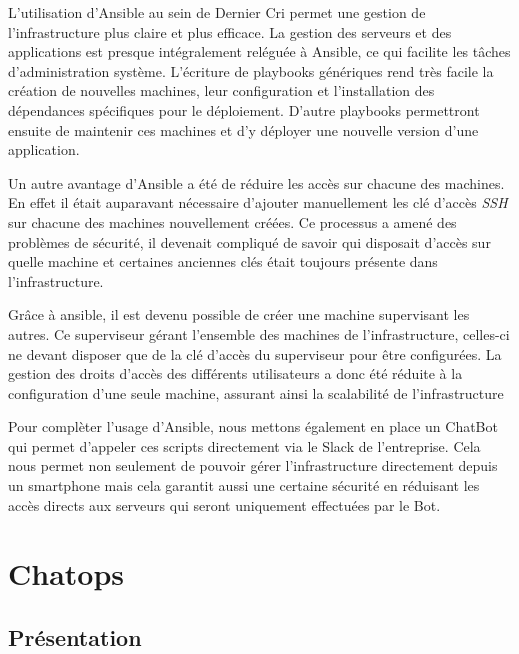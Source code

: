 L'utilisation d'Ansible au sein de Dernier Cri permet une gestion de
l'infrastructure plus claire et plus efficace. La gestion des serveurs
et des applications est presque intégralement reléguée à Ansible, ce qui
facilite les tâches d'administration système. L'écriture de playbooks
génériques rend très facile la création de nouvelles machines, leur
configuration et l'installation des dépendances spécifiques pour le
déploiement. D'autre playbooks permettront ensuite de maintenir ces
machines et d'y déployer une nouvelle version d'une application.

\bigskip

Un autre avantage d'Ansible a été de réduire les accès sur chacune des
machines. En effet il était auparavant nécessaire d'ajouter manuellement
les clé d'accès \emph{SSH} sur chacune des machines nouvellement créées.
Ce processus a amené des problèmes de sécurité, il devenait compliqué de
savoir qui disposait d'accès sur quelle machine et certaines anciennes
clés était toujours présente dans l'infrastructure.

\bigskip

Grâce à ansible, il est devenu possible de créer une machine supervisant
les autres. Ce superviseur gérant l'ensemble des machines de
l'infrastructure, celles-ci ne devant disposer que de la clé d'accès du
superviseur pour être configurées. La gestion des droits d'accès des
différents utilisateurs a donc été réduite à la configuration d'une
seule machine, assurant ainsi la scalabilité de l'infrastructure

\bigskip

Pour complèter l'usage d'Ansible, nous mettons également en place un
ChatBot qui permet d'appeler ces scripts directement via le Slack de
l'entreprise. Cela nous permet non seulement de pouvoir gérer
l'infrastructure directement depuis un smartphone mais cela garantit
aussi une certaine sécurité en réduisant les accès directs aux serveurs
qui seront uniquement effectuées par le Bot.

\newpage

\section{Chatops}\label{chatops}

\subsection{Présentation}\label{pruxe9sentation-1}

